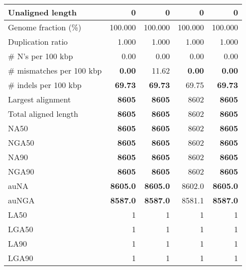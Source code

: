 \documentclass[12pt,a4paper]{article}
\begin{document}
\begin{table}[ht]
\begin{center}
\begin{tabular}{|l*{4}{|r}|}
Unaligned length & 0 & 0 & 0 & 0 \\ \hline
Genome fraction (\%) & 100.000 & 100.000 & 100.000 & 100.000 \\ \hline
Duplication ratio & 1.000 & 1.000 & 1.000 & 1.000 \\ \hline
\# N's per 100 kbp & 0.00 & 0.00 & 0.00 & 0.00 \\ \hline
\# mismatches per 100 kbp & {\bf 0.00} & 11.62 & {\bf 0.00} & {\bf 0.00} \\ \hline
\# indels per 100 kbp & {\bf 69.73} & {\bf 69.73} & 69.75 & {\bf 69.73} \\ \hline
Largest alignment & {\bf 8605} & {\bf 8605} & 8602 & {\bf 8605} \\ \hline
Total aligned length & {\bf 8605} & {\bf 8605} & 8602 & {\bf 8605} \\ \hline
NA50 & {\bf 8605} & {\bf 8605} & 8602 & {\bf 8605} \\ \hline
NGA50 & {\bf 8605} & {\bf 8605} & 8602 & {\bf 8605} \\ \hline
NA90 & {\bf 8605} & {\bf 8605} & 8602 & {\bf 8605} \\ \hline
NGA90 & {\bf 8605} & {\bf 8605} & 8602 & {\bf 8605} \\ \hline
auNA & {\bf 8605.0} & {\bf 8605.0} & 8602.0 & {\bf 8605.0} \\ \hline
auNGA & {\bf 8587.0} & {\bf 8587.0} & 8581.1 & {\bf 8587.0} \\ \hline
LA50 & 1 & 1 & 1 & 1 \\ \hline
LGA50 & 1 & 1 & 1 & 1 \\ \hline
LA90 & 1 & 1 & 1 & 1 \\ \hline
LGA90 & 1 & 1 & 1 & 1 \\ \hline
\end{tabular}
\end{center}
\end{table}
\end{document}
